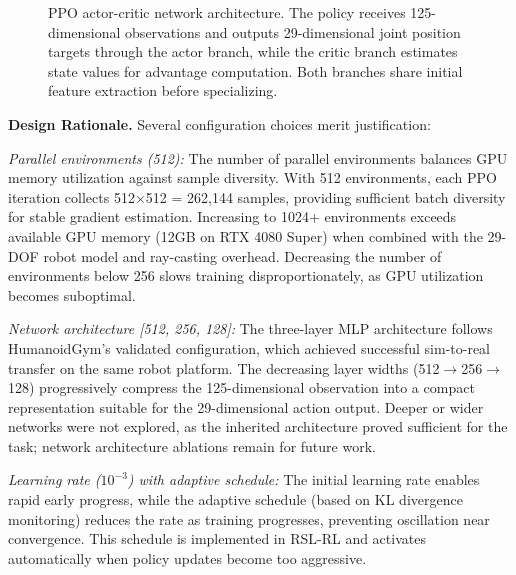 \documentclass[12pt,a4paper]{article}
\begin{document}
\begin{figure}[H]
\caption[PPO actor-critic network architecture]{PPO actor-critic network architecture. The policy receives 125-dimensional observations and outputs 29-dimensional joint position targets through the actor branch, while the critic branch estimates state values for advantage computation. Both branches share initial feature extraction before specializing.}
\label{fig:ppo_architecture}
\end{figure}

\textbf{Design Rationale.} Several configuration choices merit justification:

\textit{Parallel environments (512):} The number of parallel environments balances GPU memory utilization against sample diversity. With 512 environments, each PPO iteration collects 512$\times$512 = 262,144 samples, providing sufficient batch diversity for stable gradient estimation. Increasing to 1024+ environments exceeds available GPU memory (12GB on RTX 4080 Super) when combined with the 29-DOF robot model and ray-casting overhead. Decreasing the number of environments below 256 slows training disproportionately, as GPU utilization becomes suboptimal.

\textit{Network architecture [512, 256, 128]:} The three-layer MLP architecture follows HumanoidGym's validated configuration, which achieved successful sim-to-real transfer on the same robot platform. The decreasing layer widths (512$\rightarrow$256$\rightarrow$128) progressively compress the 125-dimensional observation into a compact representation suitable for the 29-dimensional action output. Deeper or wider networks were not explored, as the inherited architecture proved sufficient for the task; network architecture ablations remain for future work.

\textit{Learning rate ($10^{-3}$) with adaptive schedule:} The initial learning rate enables rapid early progress, while the adaptive schedule (based on KL divergence monitoring) reduces the rate as training progresses, preventing oscillation near convergence. This schedule is implemented in RSL-RL and activates automatically when policy updates become too aggressive.
\end{document}

